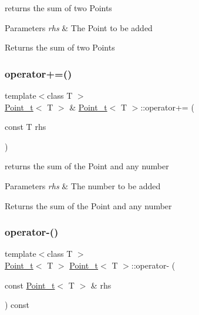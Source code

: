returns the sum of two Points 


\begin{DoxyParams}{Parameters}
{\em rhs} & The Point to be added\\
\hline
\end{DoxyParams}
\begin{DoxyReturn}{Returns}
the sum of two Points 
\end{DoxyReturn}
\mbox{\label{class_point__t_adf6b36a63ecb3250ee9f35f1611e9393}} 
\subsubsection{\texorpdfstring{operator+=()}{operator+=()}\hspace{0.1cm}{\footnotesize\ttfamily [2/2]}}
{\footnotesize\ttfamily template$<$class T $>$ \\
\hyperlink{class_point__t}{Point\+\_\+t}$<$ T $>$ \& \hyperlink{class_point__t}{Point\+\_\+t}$<$ T $>$\+::operator+= (\begin{DoxyParamCaption}\item[{const T}]{rhs }\end{DoxyParamCaption})}



returns the sum of the Point and any number 


\begin{DoxyParams}{Parameters}
{\em rhs} & The number to be added\\
\hline
\end{DoxyParams}
\begin{DoxyReturn}{Returns}
the sum of the Point and any number 
\end{DoxyReturn}
\mbox{\label{class_point__t_ab20b4b331780f76392d465f498ca14e1}} 
\subsubsection{\texorpdfstring{operator-\/()}{operator-()}\hspace{0.1cm}{\footnotesize\ttfamily [1/2]}}
{\footnotesize\ttfamily template$<$class T $>$ \\
\hyperlink{class_point__t}{Point\+\_\+t}$<$ T $>$ \hyperlink{class_point__t}{Point\+\_\+t}$<$ T $>$\+::operator-\/ (\begin{DoxyParamCaption}\item[{const \hyperlink{class_point__t}{Point\+\_\+t}$<$ T $>$ \&}]{rhs }\end{DoxyParamCaption}) const}



